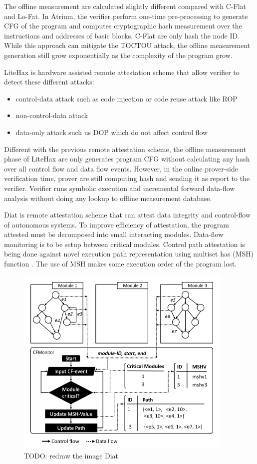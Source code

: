 The offline measurement are calculated slightly different compared with C-Flat and Lo-Fat. In Atrium, the verifier perform one-time pre-processing to generate CFG of the program and computes cryptographic hash measurement over the instructions and addresses of basic blocks. C-Flat are only hash the node ID. While this approach can mitigate the TOCTOU attack, the offline measurement generation still grow exponentially as the complexity of the program grow. 

LiteHax \cite{dessoukyLiteHAXLightweightHardwareassisted2018} is hardware assisted remote attestation scheme that allow verifier to detect these different attacks:

\begin{itemize}
    \item control-data attack such as code injection or code reuse attack like ROP
    \item non-control-data attack
    \item data-only attack such us DOP which do not affect control flow
\end{itemize}

Different with the previous remote attestation scheme, the offline measurement phase of LiteHax are only generates program CFG without calculating any hash over all control flow and data flow events. However, in the online prover-side verification time, prover are still computing hash and sending it as report to the verifier. Verifier runs symbolic execution and incremental forward data-flow analysis without doing any lookup to offline measurement database.

Diat \cite{aberaDIATDataIntegrity2019} is remote attestation scheme that can attest data integrity and control-flow of autonomous systems. To improve efficiency of attestation, the program attested must be decomposed into small interacting modules. Data-flow monitoring is to be setup between critical modules. Control path attestation is being done against novel execution path representation using multiset has (MSH) function \cite{clarkeIncrementalMultisetHash2003}. The use of MSH makes some execution order of the program lost.

\begin{figure}[htbp]
\centerline{\includegraphics[scale=.5]{Figures/01/diat.png}}
\caption{TODO: redraw the image Diat}
\label{fig:diat}
\end{figure}

